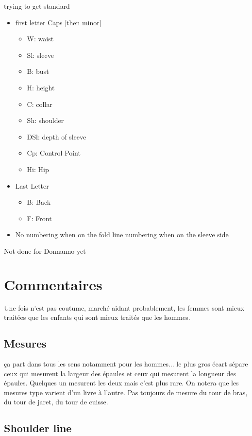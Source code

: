 \documentclass[11pt,a4paper]{report}
\begin{document}
trying to get standard
\begin{itemize}
\item		first letter Caps [then minor]
\begin{itemize}
\item		W: waist
\item		Sl: sleeve
\item		B: bust
\item		H: height
\item		C: collar
\item		Sh: shoulder
\item		DSl: depth of sleeve
\item		Cp: Control Point
\item		Hi: Hip
\end{itemize}

\item		Last Letter
\begin{itemize}
\item		B: Back
\item		F: Front
\end{itemize}

\item		No numbering when on the fold line numbering when on the sleeve side
\end{itemize}


Not done for Donnanno yet

\chapter{Commentaires}

Une fois n'est pas coutume, marché aidant probablement, les femmes sont mieux traitées que les enfants qui sont mieux traités que les hommes.

\section{Mesures}
ça part dans tous les sens notamment pour les hommes... le plus gros écart sépare ceux qui mesurent la largeur des épaules et ceux qui mesurent la longueur des épaules. Quelques un mesurent les deux mais c'est plus rare. On notera que les mesures type varient d'un livre à l'autre. Pas toujours de mesure du tour de bras, du tour de jaret, du tour de cuisse.

\section{Shoulder line}
\end{document}
